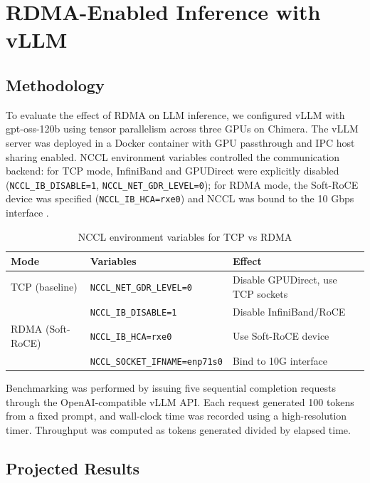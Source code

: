 \documentclass[10pt,letterpaper]{article}
\begin{document}
\section{RDMA-Enabled Inference with vLLM}

\subsection{Methodology}

To evaluate the effect of RDMA on LLM inference, we configured vLLM \cite{vllm-gptoss} with gpt-oss-120b using tensor parallelism across three GPUs on Chimera. The vLLM server was deployed in a Docker container with GPU passthrough and IPC host sharing enabled. NCCL \cite{nccl-docs} environment variables controlled the communication backend: for TCP mode, InfiniBand and GPUDirect were explicitly disabled (\texttt{NCCL\_IB\_DISABLE=1}, \texttt{NCCL\_NET\_GDR\_LEVEL=0}); for RDMA mode, the Soft-RoCE device was specified (\texttt{NCCL\_IB\_HCA=rxe0}) and NCCL was bound to the 10 Gbps interface \cite{nccl-env}.

\begin{table}[H]
\centering
\small
\begin{tabular}{@{}llp{6cm}@{}}
\toprule
\textbf{Mode} & \textbf{Variables} & \textbf{Effect} \\
\midrule
TCP (baseline) & \texttt{NCCL\_NET\_GDR\_LEVEL=0} & Disable GPUDirect, use TCP sockets \\
 & \texttt{NCCL\_IB\_DISABLE=1} & Disable InfiniBand/RoCE \cite{nccl-env} \\
\midrule
RDMA (Soft-RoCE) & \texttt{NCCL\_IB\_HCA=rxe0} & Use Soft-RoCE device \\
 & \texttt{NCCL\_SOCKET\_IFNAME=enp71s0} & Bind to 10G interface \\
\bottomrule
\end{tabular}
\caption{NCCL environment variables for TCP vs RDMA}
\end{table}

Benchmarking was performed by issuing five sequential completion requests through the OpenAI-compatible vLLM API. Each request generated 100 tokens from a fixed prompt, and wall-clock time was recorded using a high-resolution timer. Throughput was computed as tokens generated divided by elapsed time.

\subsection{Projected Results}
\end{document}
